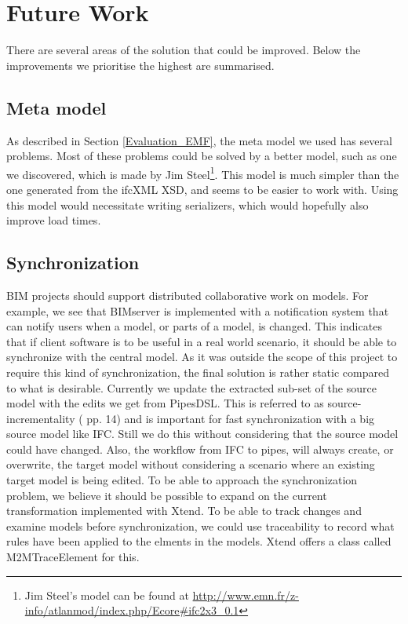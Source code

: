 \section{Future Work}
\label{sec:future_work}
There are several areas of the solution that could be improved. Below the improvements we prioritise the highest are summarised.
\subsection{Meta model}
As described in Section \ref{Evaluation_EMF}, the meta model we used has several problems. Most of these problems could be solved by a better model, such as one we discovered, which is made by Jim Steel\footnote{Jim Steel's model can be found at \url{http://www.emn.fr/z-info/atlanmod/index.php/Ecore#ifc2x3_0.1}}. This model is much simpler than the one generated from the ifcXML XSD, and seems to be easier to work with. Using this model would necessitate writing serializers, which would hopefully also improve load times.
\subsection{Synchronization}
    BIM projects should support distributed collaborative work on models. For example, we see that BIMserver is implemented with a notification system that can notify users when a model, or parts of a model, is changed. This indicates that if client software is to be useful in a real world scenario, it should be able to synchronize with the central model. As it was outside the scope of this project to require this kind of synchronization, the final solution is rather static compared to what is desirable. Currently we update the extracted sub-set of the source model with the edits we get from PipesDSL. This is referred to as source-incrementality (\cite{czarnecki06} pp. 14) and is important for fast synchronization with a big source model like IFC. Still we do this without considering that the source model could have changed. Also, the workflow from IFC to pipes, will always create, or overwrite, the target model without considering a scenario where an existing target model is being edited. To be able to approach the synchronization problem, we believe it should be possible to expand on the current transformation implemented with Xtend. To be able to track changes and examine models before synchronization, we could use traceability to record what rules have been applied to the elments in the models. Xtend offers a class called M2MTraceElement\cite{xtendtrace} for this.

